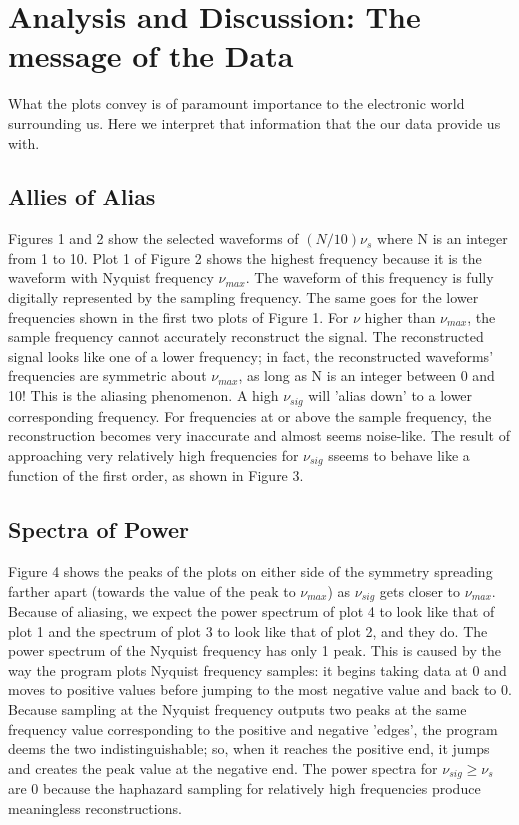 \documentclass[12pt]{article}
\begin{document}
\section{Analysis and Discussion: The message of the Data}
What the plots convey is of paramount importance to the electronic world
surrounding us. Here we interpret that information that the our data
provide us with.
\subsection{Allies of Alias}
Figures 1 and 2 show the selected waveforms of $(N/10)\nu_{s}$ where N
is an integer from 1 to 10. Plot 1 of Figure 2 shows the highest
frequency because it is the waveform with Nyquist frequency $\nu_{max}$. The
waveform of this frequency is fully digitally represented by the
sampling frequency. The same goes for the lower frequencies shown in the
first two plots of Figure 1. For $\nu$ higher than $\nu_{max}$, the
sample frequency cannot accurately reconstruct the signal. The
reconstructed signal looks like one of a lower frequency; in fact, the
reconstructed waveforms' frequencies are symmetric about $\nu_{max}$, as
long as N is an integer between 0 and 10! This is the aliasing
phenomenon. A high $\nu_{sig}$ will 'alias down' to a lower
corresponding frequency. For frequencies at or above the sample
frequency, the reconstruction becomes very inaccurate and almost seems
noise-like. The result of approaching very relatively high frequencies
for $\nu_{sig}$ sseems to behave like a function of the first order, 
as shown in Figure 3. 
\subsection{Spectra of Power}
Figure 4 shows the peaks of the plots on either side of the symmetry
spreading farther apart (towards the value of the peak to $\nu_{max}$)
as $\nu_{sig}$ gets closer to $\nu_{max}$. Because of
aliasing, we expect the power spectrum of plot 4 to look like that of
plot 1 and the spectrum of plot 3 to look like that of plot 2, and they
do. The power spectrum of the Nyquist frequency has only 1 peak. This is
caused by the way the program plots Nyquist frequency samples: it begins
taking data at 0 and moves to positive values before jumping to the most
negative value and back to 0. Because sampling at the Nyquist frequency
outputs two peaks at the same frequency value corresponding to the
positive and negative 'edges', the program deems the two
indistinguishable; so, when it reaches the positive end, it jumps and
creates the peak value at the negative end. The power spectra for
$\nu_{sig} \geq \nu_{s}$ are 0 because the haphazard sampling for
relatively high frequencies produce meaningless reconstructions. 
\end{document}
